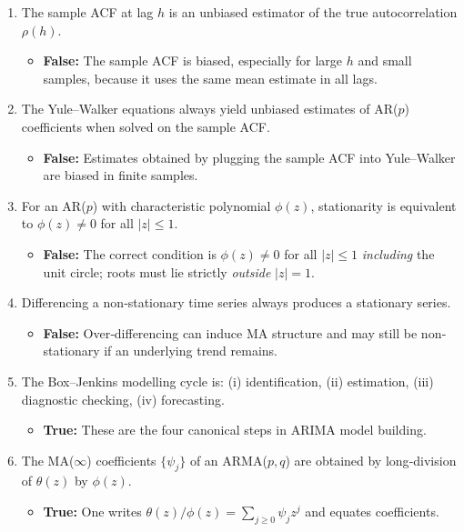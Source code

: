 \documentclass[11pt]{article}
\begin{document}
\begin{enumerate}
  \item The sample ACF at lag $h$ is an unbiased estimator of the true autocorrelation $\rho(h)$.
  \begin{itemize}
    \item \textbf{False:}  The sample ACF is biased, especially for large $h$ and small samples, because it uses the same mean estimate in all lags.
  \end{itemize}

  \item The Yule–Walker equations always yield unbiased estimates of AR($p$) coefficients when solved on the sample ACF.
  \begin{itemize}
    \item \textbf{False:}  Estimates obtained by plugging the sample ACF into Yule–Walker are biased in finite samples.
  \end{itemize}

  \item For an AR($p$) with characteristic polynomial $\phi(z)$, stationarity is equivalent to $\phi(z)\neq0$ for all $|z|\le1$.
  \begin{itemize}
    \item \textbf{False:} The correct condition is $\phi(z)\neq0$ for all $|z|\le1$ \emph{including} the unit circle; roots must lie strictly \emph{outside} $|z|=1$.
  \end{itemize}

  \item Differencing a non‐stationary time series always produces a stationary series.
  \begin{itemize}
    \item \textbf{False:} Over‐differencing can induce MA structure and may still be non‐stationary if an underlying trend remains.
  \end{itemize}

  \item The Box–Jenkins modelling cycle is: (i) identification, (ii) estimation, (iii) diagnostic checking, (iv) forecasting.
  \begin{itemize}
    \item \textbf{True:}  These are the four canonical steps in ARIMA model building.
  \end{itemize}

  \item The MA($\infty$) coefficients $\{\psi_j\}$ of an ARMA($p,q$) are obtained by long‐division of $\theta(z)$ by $\phi(z)$.
  \begin{itemize}
    \item \textbf{True:}  One writes $\theta(z)/\phi(z)=\sum_{j\ge0}\psi_j z^j$ and equates coefficients.
  \end{itemize}


\end{enumerate}
\end{document}
